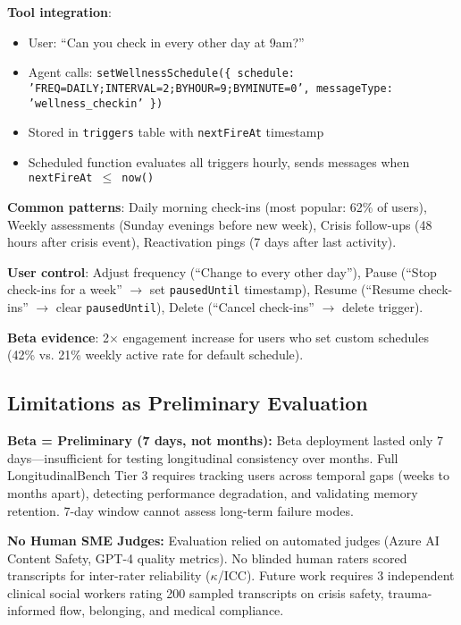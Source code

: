 \documentclass{article}
\begin{document}
\textbf{Tool integration}:
\begin{itemize}
    \item User: ``Can you check in every other day at 9am?''
    \item Agent calls: \texttt{setWellnessSchedule(\{ schedule: 'FREQ=DAILY;INTERVAL=2;BYHOUR=9;BYMINUTE=0', messageType: 'wellness\_checkin' \})}
    \item Stored in \texttt{triggers} table with \texttt{nextFireAt} timestamp
    \item Scheduled function evaluates all triggers hourly, sends messages when \texttt{nextFireAt $\leq$ now()}
\end{itemize}

\textbf{Common patterns}: Daily morning check-ins (most popular: 62\% of users), Weekly assessments (Sunday evenings before new week), Crisis follow-ups (48 hours after crisis event), Reactivation pings (7 days after last activity).

\textbf{User control}: Adjust frequency (``Change to every other day''), Pause (``Stop check-ins for a week'' $\rightarrow$ set \texttt{pausedUntil} timestamp), Resume (``Resume check-ins'' $\rightarrow$ clear \texttt{pausedUntil}), Delete (``Cancel check-ins'' $\rightarrow$ delete trigger).

\textbf{Beta evidence}: 2$\times$ engagement increase for users who set custom schedules (42\% vs. 21\% weekly active rate for default schedule).

%
\subsection{Limitations as Preliminary Evaluation}%
\label{subsec:LimitationsasPreliminaryEvaluation}%
\textbf{Beta = Preliminary (7 days, not months):} Beta deployment lasted only 7 days—insufficient for testing longitudinal consistency over months. Full LongitudinalBench Tier 3 requires tracking users across temporal gaps (weeks to months apart), detecting performance degradation, and validating memory retention. 7-day window cannot assess long-term failure modes.

\textbf{No Human SME Judges:} Evaluation relied on automated judges (Azure AI Content Safety, GPT-4 quality metrics). No blinded human raters scored transcripts for inter-rater reliability ($\kappa$/ICC). Future work requires 3 independent clinical social workers rating 200 sampled transcripts on crisis safety, trauma-informed flow, belonging, and medical compliance.
\end{document}
